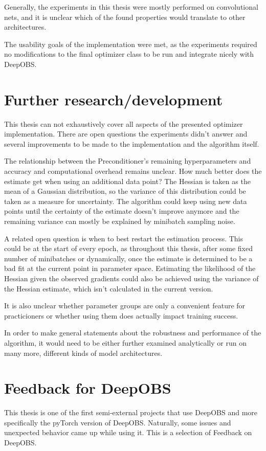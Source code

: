 \documentclass[twoside,12pt,a4paper]{report}
\begin{document}
Generally, the experiments in this thesis were mostly performed on convolutional nets, and it is unclear which of the found properties would translate to other architectures.

The usability goals of the implementation were met, as the experiments required no modifications to the final optimizer class to be run and integrate nicely with DeepOBS.

\section{Further research/development}
This thesis can not exhaustively cover all aspects of the presented optimizer implementation. There are open questions the experiments didn't answer and several improvements to be made to the implementation and the algorithm itself.

The relationship between the Preconditioner's remaining hyperparameters and accuracy and computational overhead remains unclear. How much better does the estimate get when using an additional data point? The Hessian is taken as the mean of a Gaussian distribution, so the variance of this distribution could be taken as a measure for uncertainty. The algorithm could keep using new data points until the certainty of the estimate doesn't improve anymore and the remaining variance can mostly be explained by minibatch sampling noise.

A related open question is when to best restart the estimation process. This could be at the start of every epoch, as throughout this thesis, after some fixed number of minibatches or dynamically, once the estimate is determined to be a bad fit at the current point in parameter space. Estimating the likelihood of the Hessian given the observed gradients could also be achieved using the variance of the Hessian estimate, which isn't calculated in the current version.

It is also unclear whether parameter groups are only a convenient feature for practicioners or whether using them does actually impact training success.

In order to make general statements about the robustness and performance of the algorithm, it would need to be either further examined analytically or run on many more, different kinds of model architectures.

\section{Feedback for DeepOBS}
This thesis is one of the first semi-external projects that use DeepOBS and more specifically the pyTorch version of DeepOBS. Naturally, some issues and unexpected behavior came up while using it. This is a selection of Feedback on DeepOBS.
\end{document}
